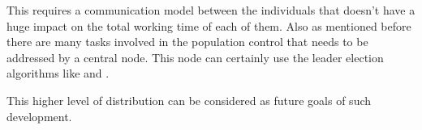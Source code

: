 \documentclass[twocolumn]{article}
\begin{document}
This requires a communication model between the individuals that doesn't have a huge impact on the total working time of each of them. Also as mentioned before there are many tasks involved in the population control that needs to be addressed by a central node. This node can certainly use the leader election algorithms like \cite{LeaderElection1} and \cite{LeaderElection2} .

This higher level of distribution can be considered as future goals of such development.




\end{document}
